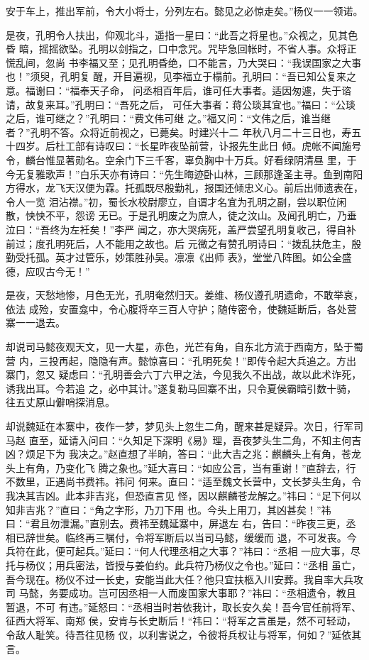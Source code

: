 安于车上，推出军前，令大小将士，分列左右。懿见之必惊走矣。”杨仪一一领诺。

是夜，孔明令人扶出，仰观北斗，遥指一星曰：“此吾之将星也。”众视之，见其色昏
暗，摇摇欲坠。孔明以剑指之，口中念咒。咒毕急回帐时，不省人事。众将正慌乱间，忽尚
书李福又至；见孔明昏绝，口不能言，乃大哭曰：“我误国家之大事也！”须臾，孔明复
醒，开目遍视，见李福立于榻前。孔明曰：“吾已知公复来之意。福谢曰：“福奉天子命，
问丞相百年后，谁可任大事者。适因匆遽，失于谘请，故复来耳。”孔明曰：“吾死之后，
可任大事者：蒋公琰其宜也。”福曰：“公琰之后，谁可继之？”孔明曰：“费文伟可继
之。”福又问：“文伟之后，谁当继者？”孔明不答。众将近前视之，已薨矣。时建兴十二
年秋八月二十三日也，寿五十四岁。后杜工部有诗叹曰：“长星昨夜坠前营，讣报先生此日
倾。虎帐不闻施号令，麟台惟显著勋名。空余门下三千客，辜负胸中十万兵。好看绿阴清昼
里，于今无复雅歌声！”白乐天亦有诗曰：“先生晦迹卧山林，三顾那逢圣主寻。鱼到南阳
方得水，龙飞天汉便为霖。托孤既尽殷勤礼，报国还倾忠义心。前后出师遗表在，令人一览
泪沾襟。”初，蜀长水校尉廖立，自谓才名宜为孔明之副，尝以职位闲散，怏怏不平，怨谤
无已。于是孔明废之为庶人，徒之汶山。及闻孔明亡，乃垂泣曰：“吾终为左衽矣！”李严
闻之，亦大哭病死，盖严尝望孔明复收己，得自补前过；度孔明死后，人不能用之故也。后
元微之有赞孔明诗曰：“拨乱扶危主，殷勤受托孤。英才过管乐，妙策胜孙吴。凛凛《出师
表》，堂堂八阵图。如公全盛德，应叹古今无！”

是夜，天愁地惨，月色无光，孔明奄然归天。姜维、杨仪遵孔明遗命，不敢举哀，依法
成殓，安置龛中，令心腹将卒三百人守护；随传密令，使魏延断后，各处营寨一一退去。

却说司马懿夜观天文，见一大星，赤色，光芒有角，自东北方流于西南方，坠于蜀营
内，三投再起，隐隐有声。懿惊喜曰：“孔明死矣！”即传令起大兵追之。方出寨门，忽又
疑虑曰：“孔明善会六丁六甲之法，今见我久不出战，故以此术诈死，诱我出耳。今若追
之，必中其计。”遂复勒马回寨不出，只令夏侯霸暗引数十骑，往五丈原山僻哨探消息。

却说魏延在本寨中，夜作一梦，梦见头上忽生二角，醒来甚是疑异。次日，行军司马赵
直至，延请入问曰：“久知足下深明《易》理，吾夜梦头生二角，不知主何吉凶？烦足下为
我决之。”赵直想了半晌，答曰：“此大吉之兆：麒麟头上有角，苍龙头上有角，乃变化飞
腾之象也。”延大喜曰：“如应公言，当有重谢！”直辞去，行不数里，正遇尚书费祎。祎问
何来。直曰：“适至魏文长营中，文长梦头生角，令我决其吉凶。此本非吉兆，但恐直言见
怪，因以麒麟苍龙解之。”祎曰：“足下何以知非吉兆？”直曰：“角之字形，乃刀下用
也。今头上用刀，其凶甚矣！”祎曰：“君且勿泄漏。”直别去。费祎至魏延寨中，屏退左
右，告曰：“昨夜三更，丞相已辞世矣。临终再三嘱付，令将军断后以当司马懿，缓缓而
退，不可发丧。今兵符在此，便可起兵。”延曰：“何人代理丞相之大事？”祎曰：“丞相
一应大事，尽托与杨仪；用兵密法，皆授与姜伯约。此兵符乃杨仪之令也。”延曰：“丞相
虽亡，吾今现在。杨仪不过一长史，安能当此大任？他只宜扶柩入川安葬。我自率大兵攻司
马懿，务要成功。岂可因丞相一人而废国家大事耶？”祎曰：“丞相遗令，教且暂退，不可
有违。”延怒曰：“丞相当时若依我计，取长安久矣！吾今官任前将军、征西大将军、南郑
侯，安肯与长史断后！“祎曰：“将军之言虽是，然不可轻动，令敌人耻笑。待吾往见杨
仪，以利害说之，令彼将兵权让与将军，何如？”延依其言。


